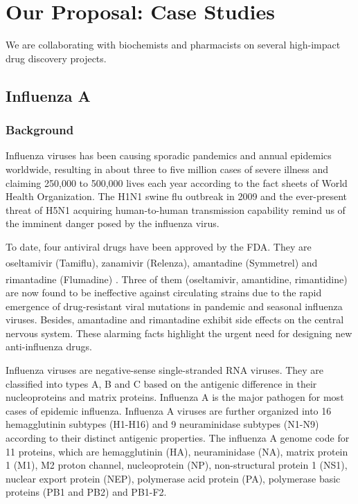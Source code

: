 \chapter{Our Proposal: Case Studies}

We are collaborating with biochemists and pharmacists on several high-impact drug discovery projects.

\section{Influenza A}

\subsection{Background}

Influenza viruses has been causing sporadic pandemics and annual epidemics worldwide, resulting in about three to five million cases of severe illness and claiming 250,000 to 500,000 lives each year according to the fact sheets of World Health Organization. The H1N1 swine flu outbreak in 2009 and the ever-present threat of H5N1 acquiring human-to-human transmission capability remind us of the imminent danger posed by the influenza virus.

To date, four antiviral drugs have been approved by the FDA. They are oseltamivir (Tamiflu\textsuperscript{\textregistered}), zanamivir (Relenza\textsuperscript{\textregistered}), amantadine (Symmetrel\textsuperscript{\textregistered}) and rimantadine (Flumadine\textsuperscript{\textregistered}) \citep{1229}. Three of them (oseltamivir, amantidine, rimantidine) are now found to be ineffective against circulating strains due to the rapid emergence of drug-resistant viral mutations in pandemic and seasonal influenza viruses. Besides, amantadine and rimantadine exhibit side effects on the central nervous system. These alarming facts highlight the urgent need for designing new anti-influenza drugs.

Influenza viruses are negative-sense single-stranded RNA viruses. They are classified into types A, B and C based on the antigenic difference in their nucleoproteins and matrix proteins. Influenza A is the major pathogen for most cases of epidemic influenza. Influenza A viruses are further organized into 16 hemagglutinin subtypes (H1-H16) and 9 neuraminidase subtypes (N1-N9) according to their distinct antigenic properties. The influenza A genome code for 11 proteins, which are hemagglutinin (HA), neuraminidase (NA), matrix protein 1 (M1), M2 proton channel, nucleoprotein (NP), non-structural protein 1 (NS1), nuclear export protein (NEP), polymerase acid protein (PA), polymerase basic proteins (PB1 and PB2) and PB1-F2.

